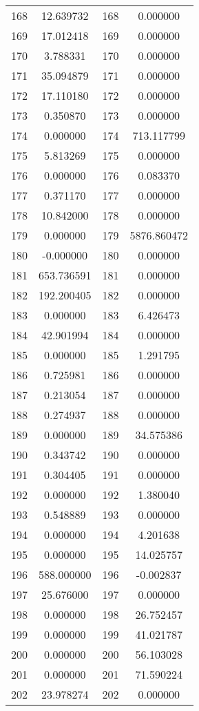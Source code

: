 \documentclass[12pt]{article}
\begin{document}
\begin{longtable}{@{}cccc@{}}
168 & 12.639732 & 168 & 0.000000 \\
169 & 17.012418 & 169 & 0.000000 \\
170 & 3.788331 & 170 & 0.000000 \\
171 & 35.094879 & 171 & 0.000000 \\
172 & 17.110180 & 172 & 0.000000 \\
173 & 0.350870 & 173 & 0.000000 \\
174 & 0.000000 & 174 & 713.117799 \\
175 & 5.813269 & 175 & 0.000000 \\
176 & 0.000000 & 176 & 0.083370 \\
177 & 0.371170 & 177 & 0.000000 \\
178 & 10.842000 & 178 & 0.000000 \\
179 & 0.000000 & 179 & 5876.860472 \\
180 & -0.000000 & 180 & 0.000000 \\
181 & 653.736591 & 181 & 0.000000 \\
182 & 192.200405 & 182 & 0.000000 \\
183 & 0.000000 & 183 & 6.426473 \\
184 & 42.901994 & 184 & 0.000000 \\
185 & 0.000000 & 185 & 1.291795 \\
186 & 0.725981 & 186 & 0.000000 \\
187 & 0.213054 & 187 & 0.000000 \\
188 & 0.274937 & 188 & 0.000000 \\
189 & 0.000000 & 189 & 34.575386 \\
190 & 0.343742 & 190 & 0.000000 \\
191 & 0.304405 & 191 & 0.000000 \\
192 & 0.000000 & 192 & 1.380040 \\
193 & 0.548889 & 193 & 0.000000 \\
194 & 0.000000 & 194 & 4.201638 \\
195 & 0.000000 & 195 & 14.025757 \\
196 & 588.000000 & 196 & -0.002837 \\
197 & 25.676000 & 197 & 0.000000 \\
198 & 0.000000 & 198 & 26.752457 \\
199 & 0.000000 & 199 & 41.021787 \\
200 & 0.000000 & 200 & 56.103028 \\
201 & 0.000000 & 201 & 71.590224 \\
202 & 23.978274 & 202 & 0.000000 \\

\end{longtable}
\end{document}
